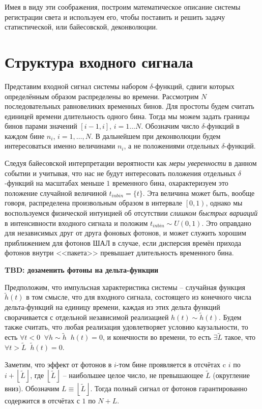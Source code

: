 Имея в виду эти соображения, построим математическое описание системы регистрации света и используем его, чтобы поставить и решить задачу статистической, или байесовской, деконволюции.

\section{Структура входного сигнала}

Представим входной сигнал системы набором $\delta$-функций, сдвиги которых определённым образом распределены во времени. Рассмотрим $N$ последовательных равновеликих временных бинов. Для простоты будем считать единицей времени длительность одного бина. Тогда мы можем задать границы бинов парами значений $[i-1, i]$, $i = 1 \ldots N$. Обозначим число $\delta$-функций в каждом бине $n_i$, $i = 1, \ldots, N$. В дальнейшем при деконволюции будем интересоваться именно величинами $n_i$, а не положениями отдельных $\delta$-функций.

Следуя байесовской интерпретации вероятности как \textit{меры уверенности} в данном событии и учитывая, что нас не будут интересовать положения отдельных $\delta$-функций на масштабах меньше $1$ временного бина, охарактеризуем это положение случайной величиной $t_{inbin} = \{ t \}$. Эта величина может быть, вообще говоря, распределена произвольным образом в интервале $\left[0, 1\right)$, однако мы воспользуемся физической интуицией об отсутствии \textit{слишком быстрых вариаций} в интенсивности входного сигнала и положим $t_{inbin} \sim U(0, 1)$. Это оправдано для независимых друг от друга фоновых фотонов, и может служить хорошим приближением для фотонов ШАЛ в случае, если дисперсия времён прихода фотонов внутри <<пакета>> превышает длительность временного бина.

\textbf{TBD: дозаменить фотоны на дельта-функции}

Предположим, что импульсная характеристика системы -- случайная функция $\tilde{h}(t)$ в том смысле, что для входного сигнала, состоящего из конечного числа дельта-функций на единицу времени, каждая из этих дельта функций сворачивается с отдельной независимой реализацией $h(t) \sim \tilde{h}(t)$. Будем также считать, что любая реализация удовлетворяет условию каузальности, то есть $\forall t < 0 \; \; \forall h \sim \tilde{h} \; \; h(t) = 0$, и конечности во времени, то есть $\exists \tilde{L}$ такое, что $\forall t > \tilde{L} \; \; \tilde{h}(t) = 0$.

Заметим, что эффект от фотонов в $i$-том бине проявляется в отсчётах c $i$ по $i + \left \lfloor{\tilde{L}}\right \rfloor$, где $\left \lfloor{\tilde{L}}\right \rfloor$ -- наибольшее целое число, не превышающее $\tilde{L}$ (округление вниз). Обозначим $L \equiv \left \lfloor{\tilde{L}}\right \rfloor$. Тогда полный сигнал от фотонов гарантированно содержится в отсчётах с $1$ по $N + L$.


